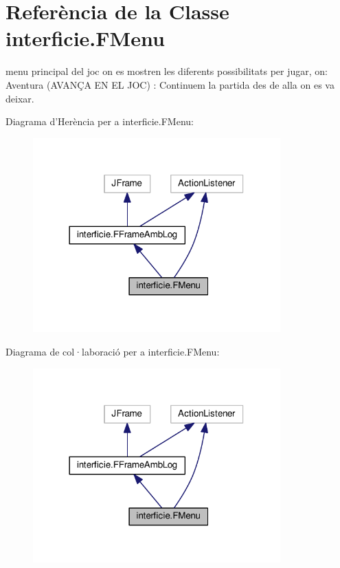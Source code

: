 \hypertarget{classinterficie_1_1_f_menu}{\section{Referència de la Classe interficie.\+F\+Menu}
\label{classinterficie_1_1_f_menu}
}


menu principal del joc on es mostren les diferents possibilitats per jugar, on\+: Aventura (A\+V\+A\+NÇ\+A E\+N E\+L J\+O\+C) \+: Continuem la partida des de alla on es va deixar.  




Diagrama d'Herència per a interficie.\+F\+Menu\+:
\nopagebreak
\begin{figure}[H]
\begin{center}
\leavevmode
\includegraphics[width=270pt]{classinterficie_1_1_f_menu__inherit__graph}
\end{center}
\end{figure}


Diagrama de col·laboració per a interficie.\+F\+Menu\+:
\nopagebreak
\begin{figure}[H]
\begin{center}
\leavevmode
\includegraphics[width=270pt]{classinterficie_1_1_f_menu__coll__graph}
\end{center}
\end{figure}
